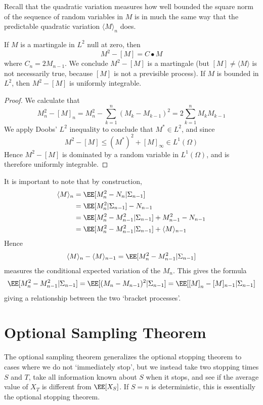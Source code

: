 Recall that the quadratic variation measures how well bounded the square norm of the sequence of random variables in $M$ is in much the same way that the predictable quadratic variation $\langle M \rangle_n$ does.

\begin{theorem}
    If $M$ is a martingale in $L^2$ null at zero, then
    \[ M^2 - [M] = C \bullet M \]
    where $C_n = 2M_{n-1}$. We conclude $M^2 - [M]$ is a martingale (but $[M] \neq \langle M \rangle$ is not necessarily true, because $[M]$ is not a previsible process). If $M$ is bounded in $L^2$, then $M^2 - [M]$ is uniformly integrable.
\end{theorem}
\begin{proof}
    We calculate that
    \[ M^2_n - [M]_n = M_n^2 - \sum_{k = 1}^n (M_k - M_{k-1})^2 = 2 \sum_{k = 1}^n M_k M_{k-1} \]
    We apply Doobs' $L^2$ inequality to conclude that $M^* \in L^2$, and since
    \[ M^2 - [M] \leq (M^*)^2 + [M]_\infty \in L^1(\Omega) \]
    Hence $M^2 - [M]$ is dominated by a random variable in $L^1(\Omega)$, and is therefore uniformly integrable.
\end{proof}

It is important to note that by construction,
    \begin{align*}
        \langle M \rangle_n &= \EE[M_n^2 - N_n|\Sigma_{n-1}]\\
        &= \EE[M_n^2|\Sigma_{n-1}] - N_{n-1}\\
        &= \EE[M_n^2 - M_{n-1}^2|\Sigma_{n-1}] + M_{n-1}^2 - N_{n-1}\\
        &= \EE[M_n^2 - M_{n-1}^2|\Sigma_{n-1}] + \langle M \rangle_{n-1}
    \end{align*}
    Hence
    \[ \langle M \rangle_n - \langle M \rangle_{n-1} = \EE[M_n^2 - M_{n-1}^2|\Sigma_{n-1}] \]
    measures the conditional expected variation of the $M_n$. This gives the formula
    \[ \EE[M_n^2 - M_{n-1}^2|\Sigma_{n-1}] = \EE[(M_n - M_{n-1})^2|\Sigma_{n-1}] = \EE[[M]_n - [M]_{n-1}|\Sigma_{n-1}] \]
    giving a relationship between the two `bracket processes'.

\section{Optional Sampling Theorem}

The optional sampling theorem generalizes the optional stopping theorem to cases where we do not `immediately stop', but we instead take two stopping times $S$ and $T$, take all information known about $S$ when it stops, and see if the average value of $X_T$ is different from $\EE[X_S]$. If $S = n$ is deterministic, this is essentially the optional stopping theorem.

